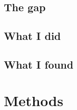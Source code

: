 \subsection{The gap}




\subsection{What I did}




\subsection{What I found}





\section{Methods}


